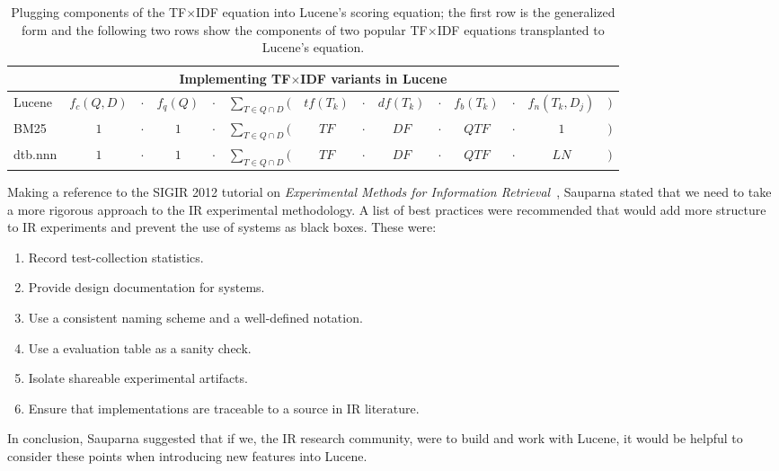 \begin{table}[bht!]
  \centering
  \small
  \begin{minipage}[t]{0.94\textwidth}

    \begin{tabular}{lccccccccccccc}
      \multicolumn{14}{c}{Implementing TF$\times$IDF variants in Lucene}
      \\
      \hline\hline

      Lucene    & $f_{c}(Q,D)$ & $\cdot$  & $f_{q}(Q)$
      & $\cdot$ & $\displaystyle\sum_{T \in Q \cap D}($  & $tf(T_{k})$
      & $\cdot$ & $df(T_{k})$  & $\cdot$  & $f_{b}(T_{k})$
      & $\cdot$ & $f_{n}(T_{k}, D_{j})$   & $)$ \\
      
      BM25      & $1$          &  $\cdot$ & $1$
      & $\cdot$ & $\displaystyle\sum_{T \in Q \cap D}($  & $TF$
      & $\cdot$ & $DF$          & $\cdot$  & $QTF$
      & $\cdot$ & $1$          & $)$ \\

      dtb.nnn   & $1$          & $\cdot$  & $1$
      & $\cdot$ & $\displaystyle\sum_{T \in Q \cap D}($  & $TF$
      & $\cdot$ & $DF$          & $\cdot$  & $QTF$
      & $\cdot$ & $LN$          & $)$ \\

      \hline\hline
    \end{tabular}

    \caption{\small Plugging components of the TF$\times$IDF equation
      into Lucene's scoring equation; the first row is the generalized
      form and the following two rows show the components of two
      popular TF$\times$IDF equations transplanted to Lucene's
      equation.}

    \label{tab:lucene}

  \end{minipage}
\end{table}

Making a reference to the SIGIR 2012 tutorial on \emph{Experimental
  Methods for Information
  Retrieval}~\cite{Metzler:2012:EMI:2348283.2348534}, Sauparna stated
that we need to take a more rigorous approach to the IR experimental
methodology. A list of best practices were recommended that would add
more structure to IR experiments and prevent the use of systems as
black boxes. These were:

\begin{enumerate}
\item Record test-collection statistics.
\item Provide design documentation for systems.
\item Use a consistent naming scheme and a well-defined notation.
\item Use a evaluation table as a sanity check.
\item Isolate shareable experimental artifacts.
\item Ensure that implementations are traceable to a source in IR
  literature.
\end{enumerate}

In conclusion, Sauparna suggested that if we, the IR research
community, were to build and work with Lucene, it would be helpful to
consider these points when introducing new features into Lucene.
